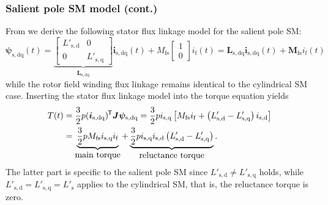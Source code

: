 \begin{frame}
	\frametitle{Salient pole SM model (cont.) }
	From  we derive the following stator flux linkage model for the salient pole SM:
	\begin{equation}
			\bm{\psi}_\mathrm{s,dq}(t) = \underbrace{\begin{bmatrix}
				L'_\mathrm{s,d} & 0\\
				0 & L'_\mathrm{s,q}
			\end{bmatrix}}_{\bm{L}_\mathrm{s,dq}} \bm{i}_{\mathrm{s,dq}}(t) + M_\mathrm{fs} \begin{bmatrix}1 \\ 0\end{bmatrix} i_{\mathrm{f}}(t) = \bm{L}_\mathrm{s,dq}\bm{i}_{\mathrm{s,dq}}(t) + \bm{M}_\mathrm{fs} i_{\mathrm{f}}(t)
	\end{equation}
	while the rotor field winding flux linkage remains identical to the cylindrical SM case. Inserting the stator flux linkage model into the torque equation yields
	\begin{equation}
		\begin{split}
			T(t) &= \frac{3}{2} p (\bm{i}_\mathrm{s,dq})^{\mkern-1.5mu\mathsf{T}}\bm{J}\bm{\psi}_\mathrm{s,dq}
			= \frac{3}{2} p i_\mathrm{s,q}\left[ M_\mathrm{fs} i_{\mathrm{f}} + \left(L'_\mathrm{s,d}-L'_\mathrm{s,q}\right)i_\mathrm{s,d}\right]\\
			& = \underbrace{\frac{3}{2} p M_\mathrm{fs} i_\mathrm{s,q}  i_{\mathrm{f}}}_{\mbox{main torque}} + \underbrace{\frac{3}{2} p i_\mathrm{s,q} i_\mathrm{s,d} \left( L'_\mathrm{s,d}-L'_\mathrm{s,q}\right)}_{\mbox{reluctance torque}}.
		\end{split}
	\end{equation}
	The latter part is specific to the salient pole SM since $L'_\mathrm{s,d} \neq  L'_\mathrm{s,q}$ holds, while $L'_\mathrm{s,d} =  L'_\mathrm{s,q} =L'_\mathrm{s}$ applies to the cylindrical SM, that is, the reluctance torque is zero.
\end{frame}

